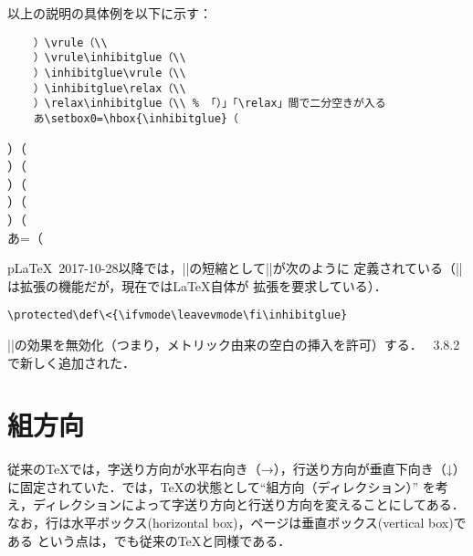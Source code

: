 \documentclass[a4paper,11pt,nomag,dvipdfmx]{jsarticle}
\begin{document}
\begin{dangerous}
  以上の説明の具体例を以下に示す：

  \medskip\noindent
  \begin{minipage}[t]{.8\linewidth}
  \begin{verbatim}
    ）\vrule（\\
    ）\vrule\inhibitglue（\\
    ）\inhibitglue\vrule（\\
    ）\inhibitglue\relax（\\
    ）\relax\inhibitglue（\\ % 「）」「\relax」間で二分空きが入る
    あ\setbox0=\hbox{\inhibitglue}（
  \end{verbatim}
  \end{minipage}\hfill
  \begin{minipage}[t]{.1\linewidth}
    ）\vrule（\\
    ）\vrule\inhibitglue（\\
    ）\inhibitglue\vrule（\\
    ）\inhibitglue\relax（\\
    ）\relax\inhibitglue（\\
    あ=\hbox{\inhibitglue}（
  \end{minipage}
\end{dangerous}
\begin{dangerous}
  p\LaTeX~2017-10-28以降では，|\inhibitglue|の短縮として|\<|が次のように
  定義されている（|\protected|は\eTeX 拡張の機能だが，現在では\LaTeX 自体が
  \eTeX 拡張を要求している）．
\begin{verbatim}
\protected\def\<{\ifvmode\leavevmode\fi\inhibitglue}
\end{verbatim}
\end{dangerous}
\begin{cslist}
\csitem[\.{disinhibitglue}]
  |\inhibitglue|の効果を無効化（つまり，メトリック由来の空白の挿入を許可）する．
  \pTeX~3.8.2で新しく追加された．
\end{cslist}



\section{組方向}

従来の\TeX では，字送り方向が水平右向き（→），行送り方向が垂直下向き（↓）
に固定されていた．\pTeX では，\TeX の状態として“組方向（ディレクション）”
を考え，ディレクションによって字送り方向と行送り方向を変えることにしてある．
なお，行は水平ボックス(horizontal box)，ページは垂直ボックス(vertical box)である
という点は，\pTeX でも従来の\TeX と同様である．
\end{document}
